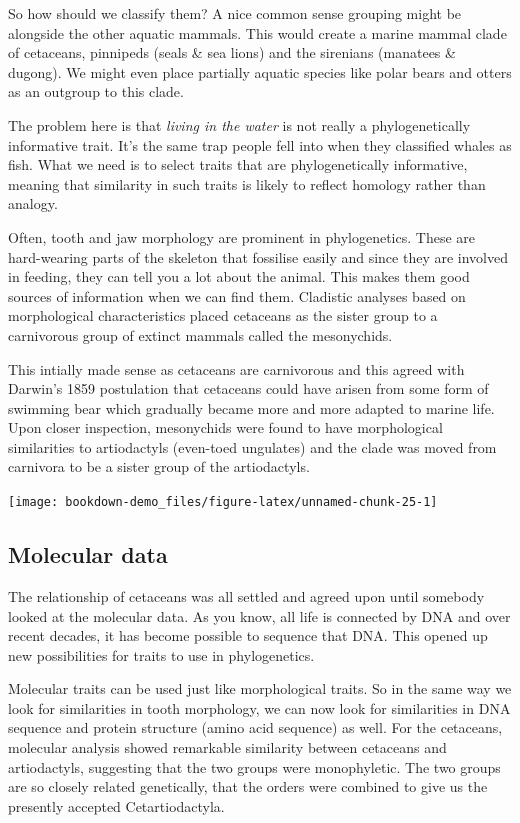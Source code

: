 \documentclass[
]{book}
\begin{document}
So how should we classify them? A nice common sense grouping might be alongside the other aquatic mammals. This would create a marine mammal clade of cetaceans, pinnipeds (seals \& sea lions) and the sirenians (manatees \& dugong). We might even place partially aquatic species like polar bears and otters as an outgroup to this clade.

The problem here is that \emph{living in the water} is not really a phylogenetically informative trait. It's the same trap people fell into when they classified whales as fish. What we need is to select traits that are phylogenetically informative, meaning that similarity in such traits is likely to reflect homology rather than analogy.

Often, tooth and jaw morphology are prominent in phylogenetics. These are hard-wearing parts of the skeleton that fossilise easily and since they are involved in feeding, they can tell you a lot about the animal. This makes them good sources of information when we can find them. Cladistic analyses based on morphological characteristics placed cetaceans as the sister group to a carnivorous group of extinct mammals called the mesonychids.

This intially made sense as cetaceans are carnivorous and this agreed with Darwin's 1859 postulation that cetaceans could have arisen from some form of swimming bear which gradually became more and more adapted to marine life. Upon closer inspection, mesonychids were found to have morphological similarities to artiodactyls (even-toed ungulates) and the clade was moved from carnivora to be a sister group of the artiodactyls.

\begin{center}\texttt{[image: bookdown-demo\_files/figure-latex/unnamed-chunk-25-1]} \end{center}

\hypertarget{molecular-data}{%
\subsection{Molecular data}\label{molecular-data}}

The relationship of cetaceans was all settled and agreed upon until somebody looked at the molecular data. As you know, all life is connected by DNA and over recent decades, it has become possible to sequence that DNA. This opened up new possibilities for traits to use in phylogenetics.

Molecular traits can be used just like morphological traits. So in the same way we look for similarities in tooth morphology, we can now look for similarities in DNA sequence and protein structure (amino acid sequence) as well. For the cetaceans, molecular analysis showed remarkable similarity between cetaceans and artiodactyls, suggesting that the two groups were monophyletic. The two groups are so closely related genetically, that the orders were combined to give us the presently accepted Cetartiodactyla.
\end{document}
